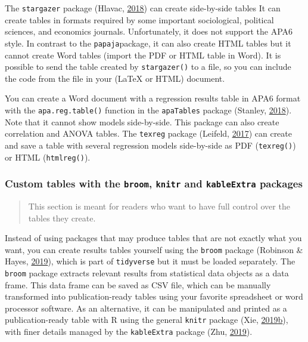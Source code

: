 \documentclass[doc,floatsintext]{apa6}
\begin{document}
The \texttt{stargazer} package (Hlavac,
\protect\hyperlink{ref-R-stargazer}{2018}) can create side-by-side
tables It can create tables in formats required by some important
sociological, political sciences, and economics journals. Unfortunately,
it does not support the APA6 style. In contrast to the
\texttt{papaja}package, it can also create HTML tables but it cannot
create Word tables (import the PDF or HTML table in Word). It is
possible to send the table created by \texttt{stargazer()} to a file, so
you can include the code from the file in your (LaTeX or HTML) document.

You can create a Word document with a regression results table in APA6
format with the \texttt{apa.reg.table()} function in the
\texttt{apaTables} package (Stanley,
\protect\hyperlink{ref-R-apaTables}{2018}). Note that it cannot show
models side-by-side. This package can also create correlation and ANOVA
tables. The \texttt{texreg} package (Leifeld,
\protect\hyperlink{ref-R-texreg}{2017}) can create and save a table with
several regression models side-by-side as PDF (\texttt{texreg()}) or
HTML (\texttt{htmlreg()}).

\subsubsection{\texorpdfstring{Custom tables with the \texttt{broom},
\texttt{knitr} and \texttt{kableExtra}
packages}{Custom tables with the broom, knitr and kableExtra packages}}\label{customtables}

\begin{quote}
This section is meant for readers who want to have full control over the
tables they create.
\end{quote}

Instead of using packages that may produce tables that are not exactly
what you want, you can create results tables yourself using the
\texttt{broom} package (Robinson \& Hayes,
\protect\hyperlink{ref-R-broom}{2019}), which is part of
\texttt{tidyverse} but it must be loaded separately. The \texttt{broom}
package extracts relevant results from statistical data objects as a
data frame. This data frame can be saved as CSV file, which can be
manually transformed into publication-ready tables using your favorite
spreadsheet or word processor software. As an alternative, it can be
manipulated and printed as a publication-ready table with R using the
general \texttt{knitr} package (Xie,
\protect\hyperlink{ref-R-knitr}{2019}\protect\hyperlink{ref-R-knitr}{b}),
with finer details managed by the \texttt{kableExtra} package (Zhu,
\protect\hyperlink{ref-R-kableExtra}{2019}).
\end{document}
